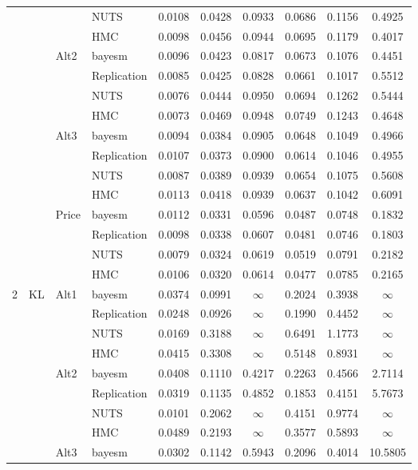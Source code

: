 \begin{longtable}{clllcccccc}
 &  &  & NUTS & 0.0108 & 0.0428 & 0.0933 & 0.0686 & 0.1156 & 0.4925 \\
 &  &  & HMC & 0.0098 & 0.0456 & 0.0944 & 0.0695 & 0.1179 & 0.4017 \\
 &  & Alt2 & bayesm & 0.0096 & 0.0423 & 0.0817 & 0.0673 & 0.1076 & 0.4451 \\
 &  &  & Replication & 0.0085 & 0.0425 & 0.0828 & 0.0661 & 0.1017 & 0.5512 \\
 &  &  & NUTS & 0.0076 & 0.0444 & 0.0950 & 0.0694 & 0.1262 & 0.5444 \\
 &  &  & HMC & 0.0073 & 0.0469 & 0.0948 & 0.0749 & 0.1243 & 0.4648 \\
 &  & Alt3 & bayesm & 0.0094 & 0.0384 & 0.0905 & 0.0648 & 0.1049 & 0.4966 \\
 &  &  & Replication & 0.0107 & 0.0373 & 0.0900 & 0.0614 & 0.1046 & 0.4955 \\
 &  &  & NUTS & 0.0087 & 0.0389 & 0.0939 & 0.0654 & 0.1075 & 0.5608 \\
 &  &  & HMC & 0.0113 & 0.0418 & 0.0939 & 0.0637 & 0.1042 & 0.6091 \\
 &  & Price & bayesm & 0.0112 & 0.0331 & 0.0596 & 0.0487 & 0.0748 & 0.1832 \\
 &  &  & Replication & 0.0098 & 0.0338 & 0.0607 & 0.0481 & 0.0746 & 0.1803 \\
 &  &  & NUTS & 0.0079 & 0.0324 & 0.0619 & 0.0519 & 0.0791 & 0.2182 \\
 &  &  & HMC & 0.0106 & 0.0320 & 0.0614 & 0.0477 & 0.0785 & 0.2165 \\
2 & KL & Alt1 & bayesm & 0.0374 & 0.0991 & $\infty$ & 0.2024 & 0.3938 & $\infty$ \\
 &  &  & Replication & 0.0248 & 0.0926 & $\infty$ & 0.1990 & 0.4452 & $\infty$ \\
 &  &  & NUTS & 0.0169 & 0.3188 & $\infty$ & 0.6491 & 1.1773 & $\infty$ \\
 &  &  & HMC & 0.0415 & 0.3308 & $\infty$ & 0.5148 & 0.8931 & $\infty$ \\
 &  & Alt2 & bayesm & 0.0408 & 0.1110 & 0.4217 & 0.2263 & 0.4566 & 2.7114 \\
 &  &  & Replication & 0.0319 & 0.1135 & 0.4852 & 0.1853 & 0.4151 & 5.7673 \\
 &  &  & NUTS & 0.0101 & 0.2062 & $\infty$ & 0.4151 & 0.9774 & $\infty$ \\
 &  &  & HMC & 0.0489 & 0.2193 & $\infty$ & 0.3577 & 0.5893 & $\infty$ \\
 &  & Alt3 & bayesm & 0.0302 & 0.1142 & 0.5943 & 0.2096 & 0.4014 & 10.5805 \\

\end{longtable}
